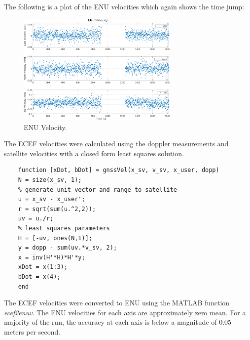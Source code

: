 \documentclass[11pt]{article}
\begin{document}
\begin{enumerate}[label=\textbf{\arabic*.}]
  The following is a plot of the ENU velocities which again shows the time jump:
  \begin{figure}[H]
    \centering
    \includegraphics[width=0.7\textwidth]{static_vel_enu.png}
    \caption{ENU Velocity.}
  \end{figure}
  The ECEF velocities were calculated using the doppler measurements and 
  satellite velocities with a closed form least squares solution. 
  \begin{lstlisting}
    function [xDot, bDot] = gnssVel(x_sv, v_sv, x_user, dopp)
    N = size(x_sv, 1);
    % generate unit vector and range to satellite
    u = x_sv - x_user';
    r = sqrt(sum(u.^2,2));
    uv = u./r;
    % least squares parameters
    H = [-uv, ones(N,1)];
    y = dopp - sum(uv.*v_sv, 2);
    x = inv(H'*H)*H'*y;
    xDot = x(1:3);
    bDot = x(4);
    end    
  \end{lstlisting}
  The ECEF velocities were converted to ENU using the MATLAB function 
  \emph{ecef2enuv}. The ENU velocities for each axis are approximately 
  zero mean. For a majority of the run, the accuracy at each axis is below 
   a magnitude of 0.05 meters per second. 


\end{enumerate}
\end{document}
